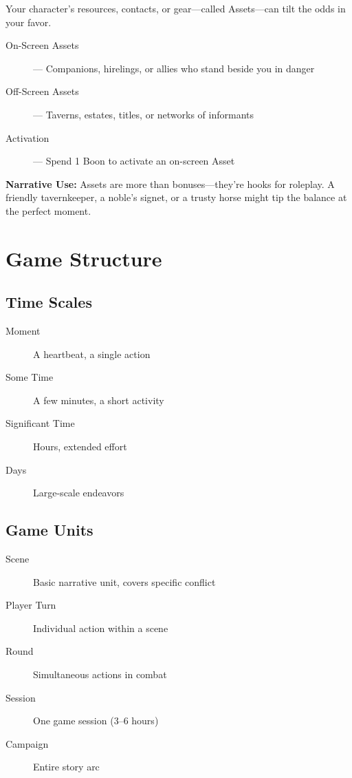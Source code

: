 \documentclass[11pt,twoside,openany]{book}
\begin{document}
Your character's resources, contacts, or gear—called Assets—can tilt the odds in your favor.

\begin{description}
\item[On-Screen Assets] — Companions, hirelings, or allies who stand beside you in danger
\item[Off-Screen Assets] — Taverns, estates, titles, or networks of informants
\item[Activation] — Spend 1 Boon to activate an on-screen Asset
\end{description}

\textbf{Narrative Use:} Assets are more than bonuses—they're hooks for roleplay. A friendly tavernkeeper, a noble's signet, or a trusty horse might tip the balance at the perfect moment.

\section*{Game Structure} 

\subsection*{Time Scales}

\begin{description}
\item[Moment] A heartbeat, a single action
\item[Some Time] A few minutes, a short activity
\item[Significant Time] Hours, extended effort
\item[Days] Large-scale endeavors
\end{description}

\subsection*{Game Units}

\begin{description}
\item[Scene] Basic narrative unit, covers specific conflict
\item[Player Turn] Individual action within a scene
\item[Round] Simultaneous actions in combat
\item[Session] One game session (3–6 hours)
\item[Campaign] Entire story arc
\end{description}
\end{document}
